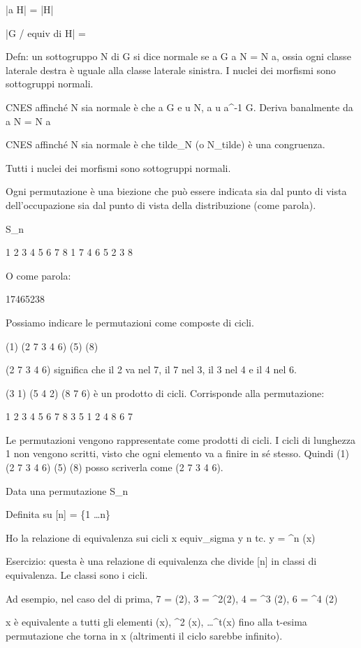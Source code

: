 |a H| = |H|

|G / equiv di H| = 

Defn:
un sottogruppo N di G si dice normale se \forall a \in G a N = N a, ossia ogni classe laterale destra \`e uguale alla classe laterale sinistra. I nuclei dei morfismi sono sottogruppi normali.

CNES affinch\'e N sia normale \`e che \forall a \in G e \forall u \in N, a \cdot u \cdot a^{-1} \in G. Deriva banalmente da a \cdot N = N \cdot a

CNES affinch\'e N sia normale \`e che tilde_N (o N_tilde) \`e una congruenza.

Tutti i nuclei dei morfismi sono sottogruppi normali.

Ogni permutazione \`e una biezione che pu\`o essere indicata sia dal punto di vista dell'occupazione sia dal punto di vista della distribuzione (come parola).

\sigma \in S_n

1 2 3 4 5 6 7 8
1 7 4 6 5 2 3 8

O come parola:

17465238

Possiamo indicare le permutazioni come composte di cicli.

\sigma (1) (2 7 3 4 6) (5) (8)

(2 7 3 4 6) significa che il 2 va nel 7, il 7 nel 3, il 3 nel 4 e il 4 nel 6.

\mu (3 1) (5 4 2) (8 7 6) \`e un prodotto di cicli. Corrisponde alla permutazione:

1 2 3 4 5 6 7 8
3 5 1 2 4 8 6 7

Le permutazioni vengono rappresentate come prodotti di cicli. I cicli di lunghezza 1 non vengono scritti, visto che ogni elemento va a finire in s\'e stesso. Quindi \sigma (1) (2 7 3 4 6) (5) (8) posso scriverla come \sigma (2 7 3 4 6).

Data una permutazione
\sigma \in S_n 

Definita su
[n] = \{1 \dots n\}

Ho la relazione di equivalenza sui cicli
x equiv_sigma y \Leftrightarrow \exists n \in {} tc. y = \sigma^{n} (x)

Esercizio: questa \`e una relazione di equivalenza che divide [n] in classi di equivalenza. Le classi sono i cicli.

Ad esempio, nel caso del \sigma di prima, 7 = \sigma(2), 3 = \sigma^{2}(2), 4 = \sigma^{3} (2), 6 = \sigma^{4} (2)

x \`e equivalente a tutti gli elementi \sigma (x), \sigma^{2} (x), \dots \sigma^{t}(x) fino alla t-esima permutazione che torna in x (altrimenti il ciclo sarebbe infinito).

